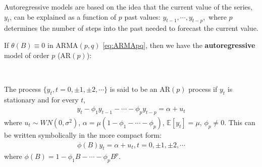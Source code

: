 Autoregressive models are based on the idea that the current value of the series,
$y_t$, can be explained as a function of $p$ past values: $y_{t-1}, \cdots, y_{t-p},$
where $p$ determines the number of steps into the past needed to forecast the current value.

If $\theta(B) \equiv 0$ in ARMA$(p,q)$ \ref{eq:ARMApq}, then we have the \textbf{autoregressive} model of order $p$ (AR$(p)$):
\begin{definition}[AR$(p)$ Process]\label{def:ARp}
    \
    
    The process $\{ y_t, t=0, \pm1, \pm2, \cdots\}$ is said to be an AR$(p)$ process if $y_t$ is stationary and for every $t$,
    \begin{gather}\label{eq:ARp}
        y_t - \phi_1 y_{t-1} - \cdots - \phi_p y_{t-p} = \alpha + u_t
    \end{gather}
    where $u_t \sim WN(0,\sigma^2)$, $\alpha = \mu \left( 1-\phi_1 - \cdots - \phi_p \right)$, $\mathbb{E}[y_t] = \mu$, $\phi_p \neq 0.$
    This can be written symbolically in the more compact form:
    \begin{gather*}
        \phi (B) y_t = \alpha + u_t, t = 0, \pm1, \pm2, \cdots
    \end{gather*}
    where $\phi (B) = 1 - \phi_1 B - \cdots - \phi_p B^p$.
\end{definition}

